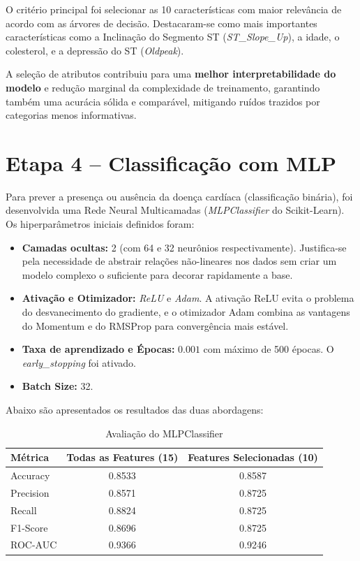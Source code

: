 \documentclass[12pt,a4paper]{article}
\begin{document}
O critério principal foi selecionar as 10 características com maior relevância de acordo com as árvores de decisão. Destacaram-se como mais importantes características como a Inclinação do Segmento ST (\textit{ST\_Slope\_Up}), a idade, o colesterol, e a depressão do ST (\textit{Oldpeak}).

A seleção de atributos contribuiu para uma \textbf{melhor interpretabilidade do modelo} e redução marginal da complexidade de treinamento, garantindo também uma acurácia sólida e comparável, mitigando ruídos trazidos por categorias menos informativas.

\section{Etapa 4 -- Classificação com MLP}
Para prever a presença ou ausência da doença cardíaca (classificação binária), foi desenvolvida uma Rede Neural Multicamadas (\textit{MLPClassifier} do Scikit-Learn). Os hiperparâmetros iniciais definidos foram:
\begin{itemize}
    \item \textbf{Camadas ocultas:} 2 (com 64 e 32 neurônios respectivamente). Justifica-se pela necessidade de abstrair relações não-lineares nos dados sem criar um modelo complexo o suficiente para decorar rapidamente a base.
    \item \textbf{Ativação e Otimizador:} \textit{ReLU} e \textit{Adam}. A ativação ReLU evita o problema do desvanecimento do gradiente, e o otimizador Adam combina as vantagens do Momentum e do RMSProp para convergência mais estável.
    \item \textbf{Taxa de aprendizado e Épocas:} $0.001$ com máximo de 500 épocas. O \textit{early\_stopping} foi ativado.
    \item \textbf{Batch Size:} 32.
\end{itemize}

Abaixo são apresentados os resultados das duas abordagens:
\begin{table}[H]
    \centering
    \begin{tabular}{l c c}
        \toprule
        \textbf{Métrica} & \textbf{Todas as Features (15)} & \textbf{Features Selecionadas (10)} \\
        \midrule
        Accuracy  & 0.8533 & 0.8587 \\
        Precision & 0.8571 & 0.8725 \\
        Recall    & 0.8824 & 0.8725 \\
        F1-Score  & 0.8696 & 0.8725 \\
        ROC-AUC   & 0.9366 & 0.9246 \\
        \bottomrule
    \end{tabular}
    \caption{Avaliação do MLPClassifier}
\end{table}
\end{document}
